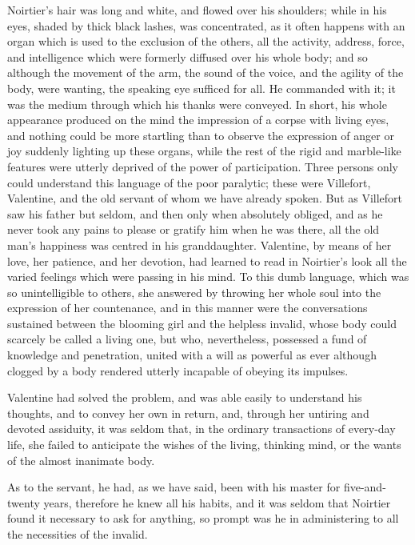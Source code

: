 Noirtier’s hair was long and white, and flowed over his shoulders;
while in his eyes, shaded by thick black lashes, was concentrated, as
it often happens with an organ which is used to the exclusion of the
others, all the activity, address, force, and intelligence which were
formerly diffused over his whole body; and so although the movement of
the arm, the sound of the voice, and the agility of the body, were
wanting, the speaking eye sufficed for all. He commanded with it; it
was the medium through which his thanks were conveyed. In short, his
whole appearance produced on the mind the impression of a corpse with
living eyes, and nothing could be more startling than to observe the
expression of anger or joy suddenly lighting up these organs, while the
rest of the rigid and marble-like features were utterly deprived of the
power of participation. Three persons only could understand this
language of the poor paralytic; these were Villefort, Valentine, and
the old servant of whom we have already spoken. But as Villefort saw
his father but seldom, and then only when absolutely obliged, and as he
never took any pains to please or gratify him when he was there, all
the old man’s happiness was centred in his granddaughter. Valentine, by
means of her love, her patience, and her devotion, had learned to read
in Noirtier’s look all the varied feelings which were passing in his
mind. To this dumb language, which was so unintelligible to others, she
answered by throwing her whole soul into the expression of her
countenance, and in this manner were the conversations sustained
between the blooming girl and the helpless invalid, whose body could
scarcely be called a living one, but who, nevertheless, possessed a
fund of knowledge and penetration, united with a will as powerful as
ever although clogged by a body rendered utterly incapable of obeying
its impulses.

Valentine had solved the problem, and was able easily to understand his
thoughts, and to convey her own in return, and, through her untiring
and devoted assiduity, it was seldom that, in the ordinary transactions
of every-day life, she failed to anticipate the wishes of the living,
thinking mind, or the wants of the almost inanimate body.

As to the servant, he had, as we have said, been with his master for
five-and-twenty years, therefore he knew all his habits, and it was
seldom that Noirtier found it necessary to ask for anything, so prompt
was he in administering to all the necessities of the invalid.

